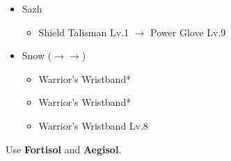 \begin{menu}
\begin{itemize}
\begin{itemize}
\begin{itemize}
				\end{itemize}
		\end{itemize}
		\equip
		\begin{itemize}
			\item Sazh
				\begin{itemize}
					\item Shield Talisman Lv.1 $\rightarrow$ Power Glove Lv.9
				\end{itemize}
			\item Snow ($\rightarrow\rightarrow$)
				\begin{itemize}
					\item Warrior's Wristband*
					\item Warrior's Wristband*
					\item Warrior's Wristband Lv.8
				\end{itemize}
		\end{itemize}
	\end{itemize}
\end{menu}

\renewcommand{\third}{[3] Relentless Assault (\com/\rav/\rav)}
\renewcommand{\fourth}{[4] Bully (\syn/\sab/\com)}
\renewcommand{\fifth}{[5] Thaumaturgy (\rav/\med/\rav)}

Use \textbf{Fortisol} and \textbf{Aegisol}.
\vfill

